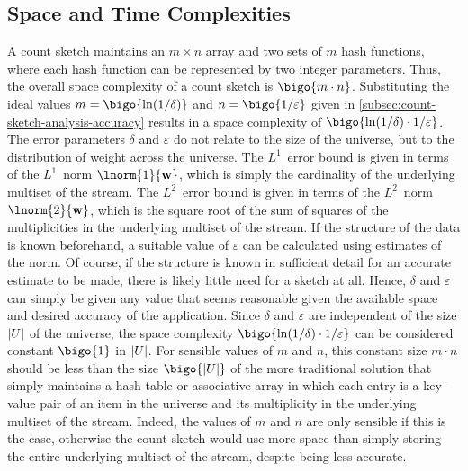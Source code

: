 \subsection{Space and Time Complexities}
\label{subsec:count-sketch-analysis-complexity}

A count sketch maintains an \( m \times n \) array and two sets of \( m \) hash functions, where each hash function can be represented by two integer parameters.
Thus, the overall space complexity of a count sketch is \( \bigo{m \cdot n} \).
Substituting the ideal values \( m = \bigo{\ln (1 / \delta)} \) and \( n = \bigo{1 / \varepsilon} \) given in \cref{subsec:count-sketch-analysis-accuracy} results in a space complexity of \( \bigo{\ln (1 / \delta) \cdot 1 / \varepsilon} \).
The error parameters \( \delta \) and \( \varepsilon \) do not relate to the size of the universe, but to the distribution of weight across the universe.
The \( L^{1} \)~error bound is given in terms of the \( L^{1} \)~norm \( \lnorm{1}{\mathvector{w}} \), which is simply the cardinality of the underlying multiset of the stream.
The \( L^{2} \)~error bound is given in terms of the \( L^{2} \)~norm \( \lnorm{2}{\mathvector{w}} \), which is the square root of the sum of squares of the multiplicities in the underlying multiset of the stream.
If the structure of the data is known beforehand, a suitable value of \( \varepsilon \) can be calculated using estimates of the norm.
Of course, if the structure is known in sufficient detail for an accurate estimate to be made, there is likely little need for a sketch at all.
Hence, \( \delta \) and \( \varepsilon \) can simply be given any value that seems reasonable given the available space and desired accuracy of the application.
Since \( \delta \) and \( \varepsilon \) are independent of the size \( \lvert U\rvert \) of the universe, the space complexity \( \bigo{\ln (1 / \delta) \cdot 1 / \varepsilon} \) can be considered constant \( \bigo{1} \) in \( \lvert U\rvert \).
For sensible values of \( m \) and \( n \), this constant size \( m \cdot n \) should be less than the size \( \bigo{\cardinality{U}} \) of the more traditional solution that simply maintains a hash table or associative array in which each entry is a key--value pair of an item in the universe and its multiplicity in the underlying multiset of the stream.
Indeed, the values of \( m \) and \( n \) are only sensible if this is the case, otherwise the count sketch would use more space than simply storing the entire underlying multiset of the stream, despite being less accurate.


